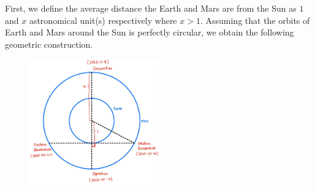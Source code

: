 \documentclass[main.tex]{subfiles}
\begin{document}
\begin{sol}
First, we define the average distance the Earth and Mars are from the Sun as $1$
and $x$ astronomical unit(s) respectively where $x > 1$. Assuming that the
orbits of Earth and Mars around the Sun is perfectly circular, we obtain the
following geometric construction.
\begin{figure}[h!]
    \centering
    \includegraphics[width=0.5\textwidth]{figure1}
\end{figure}


\end{sol}
\end{document}
